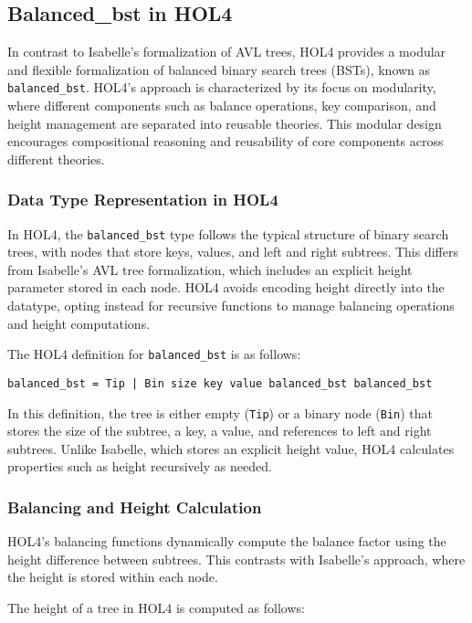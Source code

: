 \documentclass[12pt]{article}
\begin{document}
\begin{itemize}
\subsection{Balanced\_bst in HOL4}

In contrast to Isabelle’s formalization of AVL trees, HOL4 \cite{HOLBalancedBST} provides a modular and flexible formalization of balanced binary search trees (BSTs), known as \texttt{balanced\_bst}. HOL4's approach is characterized by its focus on modularity, where different components such as balance operations, key comparison, and height management are separated into reusable theories. This modular design encourages compositional reasoning and reusability of core components across different theories.

\subsubsection{Data Type Representation in HOL4}
In HOL4, the \texttt{balanced\_bst} type follows the typical structure of binary search trees, with nodes that store keys, values, and left and right subtrees. This differs from Isabelle's AVL tree formalization, which includes an explicit height parameter stored in each node. HOL4 avoids encoding height directly into the datatype, opting instead for recursive functions to manage balancing operations and height computations.

The HOL4 definition for \texttt{balanced\_bst} is as follows:

\begin{verbatim}
balanced_bst = Tip | Bin size key value balanced_bst balanced_bst
\end{verbatim}

In this definition, the tree is either empty (\texttt{Tip}) or a binary node (\texttt{Bin}) that stores the size of the subtree, a key, a value, and references to left and right subtrees. Unlike Isabelle, which stores an explicit height value, HOL4 calculates properties such as height recursively as needed.

\subsubsection{Balancing and Height Calculation}
HOL4’s balancing functions dynamically compute the balance factor using the height difference between subtrees. This contrasts with Isabelle’s approach, where the height is stored within each node.

The height of a tree in HOL4 is computed as follows:


\end{itemize}
\end{document}
